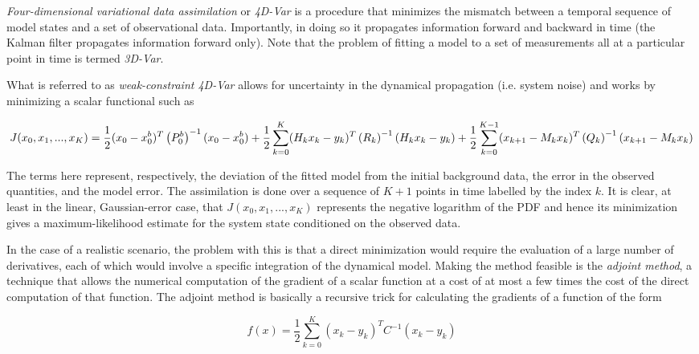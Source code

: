 {\it Four-dimensional variational data assimilation} or {\it 4D-Var} is a procedure that minimizes the mismatch between a temporal sequence of model states and a set of observational data.  
Importantly, in doing so it propagates information forward and backward in time (the Kalman filter propagates information forward only).  
Note that the problem of fitting a model to a set of measurements all at a particular point in time is termed {\it 3D-Var}.

What is referred to as {\it weak-constraint 4D-Var} allows for uncertainty in the dynamical propagation (i.e. system noise) and works by minimizing a scalar functional such as

\begin{equation}
J(x_0, x_1, ..., x_K) = \frac{1}{2} (x_0-x_0^b)^T \left ( P_0^b \right )^{-1} (x_0-x_0^b)\\
+ \frac{1}{2} \sum_{k=0}^K (H_k x_k-y_k)^T \left ( R_k \right )^{-1} (H_k x_k- y_k)\\
+ \frac{1}{2} \sum_{k=0}^{K-1} (x_{k+1}-M_k x_k)^T \left ( Q_k \right )^{-1} (x_{k+1}-M_k x_k)
\end{equation}

The terms here represent, respectively, the deviation of the fitted model from the initial background data, the error in the observed quantities, and the model error.  
The assimilation is done over a sequence of $K+1$ points in time labelled by the index $k$.  
It is clear, at least in the linear, Gaussian-error case, that $J(x_0, x_1, ..., x_K)$ represents the negative logarithm of the PDF and hence its minimization gives a maximum-likelihood estimate for the system state conditioned on the observed data.

In the case of a realistic scenario, the problem with this is that a direct minimization would require the evaluation of a large number of derivatives, each of which would involve a specific integration of the dynamical model.  
Making the method feasible is the {\it adjoint method}, a technique that allows the numerical computation of the gradient of a scalar function at a cost of at most a few times the cost of the direct computation of that function.  
The adjoint method is basically a recursive trick for calculating the gradients of a function of the form

\begin{equation}
f(x) = \frac{1}{2} \sum_{k=0}^K \left ( x_k-y_k \right )^T C^{-1} \left ( x_k-y_k \right ) 
\end{equation}

